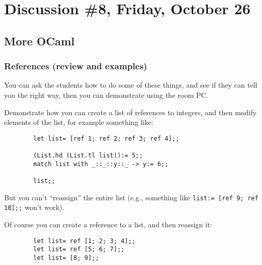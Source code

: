 \documentclass[12pt]{article}
\begin{document}

  \section{Discussion \#8, Friday, October 26}

    \subsection{More OCaml}

      \subsubsection{References (review and examples)}

        You can ask the students how to do some of these things, and see if
      they can tell you the right way, then you can demonstrate using the
      room PC.

        Demonstrate how you can create a list of references to integers, and
      then modify elements of the list, for example something like:

        \vspace{-1mm}

        \begin{center}

          \begin{BVerbatim}
        let list= [ref 1; ref 2; ref 3; ref 4];;

        (List.hd (List.tl list)):= 5;;
        match list with _::_::y::_ -> y:= 6;;

        list;;
          \end{BVerbatim}

        \end{center}

        \vspace{-1mm}

        But you can't ``reassign'' the entire list (e.g., something like
      \texttt{list:= [ref 9; ref 10];;} won't work).

        Of course you can create a reference to a list, and then reassign it:

        \vspace{-1mm}

        \begin{center}

          \begin{BVerbatim}
        let list= ref [1; 2; 3; 4];;
        let list= ref [5; 6; 7];;
        let list= [8; 9];;
          \end{BVerbatim}

        \end{center}
\end{document}
